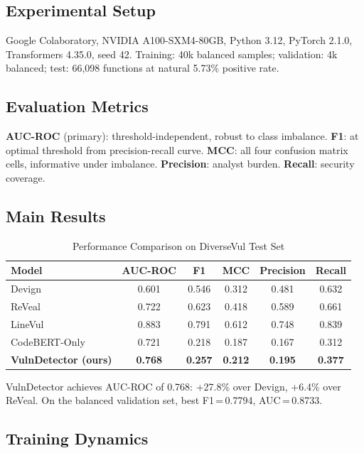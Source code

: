 \documentclass[12pt, letterpaper]{article}
\begin{document}
\subsection{Experimental Setup}

Google Colaboratory, NVIDIA A100-SXM4-80GB, Python 3.12, PyTorch 2.1.0,
Transformers 4.35.0, seed 42. Training: 40k balanced samples; validation: 4k
balanced; test: 66,098 functions at natural 5.73\% positive rate.

\subsection{Evaluation Metrics}

\textbf{AUC-ROC} (primary): threshold-independent, robust to class imbalance.
\textbf{F1}: at optimal threshold from precision-recall curve.
\textbf{MCC}: all four confusion matrix cells, informative under imbalance.
\textbf{Precision}: analyst burden.
\textbf{Recall}: security coverage.

\subsection{Main Results}

\begin{table}[H]
\centering
\caption{Performance Comparison on DiverseVul Test Set}
\label{tab:results}
\begin{tabular}{lccccc}
\toprule
\textbf{Model}&\textbf{AUC-ROC}&\textbf{F1}&\textbf{MCC}&
\textbf{Precision}&\textbf{Recall}\\
\midrule
Devign \citep{zhou2019}        &0.601&0.546&0.312&0.481&0.632\\
ReVeal \citep{chakraborty2021} &0.722&0.623&0.418&0.589&0.661\\
LineVul \citep{fu2022}         &0.883&0.791&0.612&0.748&0.839\\
CodeBERT-Only                  &0.721&0.218&0.187&0.167&0.312\\
\midrule
\textbf{VulnDetector (ours)}
  &\textbf{0.768}&\textbf{0.257}&\textbf{0.212}&\textbf{0.195}&\textbf{0.377}\\
\bottomrule
\end{tabular}
\end{table}

VulnDetector achieves AUC-ROC of 0.768: +27.8\% over Devign, +6.4\% over
ReVeal. On the balanced validation set, best F1\,=\,0.7794, AUC\,=\,0.8733.

\subsection{Training Dynamics}
\end{document}
